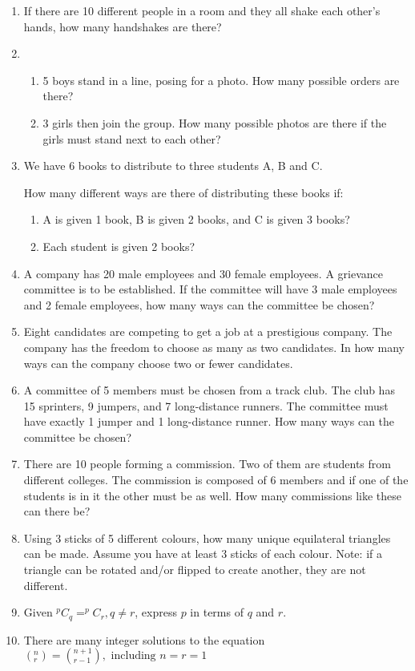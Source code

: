 \documentclass[../main.tex]{subfiles}
\begin{document}
\label{Combinations and permuations}
\begin{enumerate}[itemsep=1cm]
    \item 
    If there are 10 different people in a room and they all shake each other’s hands, how many handshakes are there?
    \item 
        \begin{enumerate}
            \item 5 boys stand in a line, posing for a photo. How many possible orders are there?
            \item 3 girls then join the group. How many possible photos are there if the girls must stand next to each other?
        \end{enumerate}
    \item 
    We have 6 books to distribute to three students A, B and C.

    How many different ways are there of distributing these books if:
        \begin{enumerate}
            \item A is given 1 book, B is given 2 books, and C is given 3 books?
            \item Each student is given 2 books?
        \end{enumerate}
    \item 
    A company has 20 male employees and 30 female employees. A grievance committee is to be established. If the committee will have 3 male employees and 2 female employees, how many ways can the committee be chosen?
    \item 
    Eight candidates are competing to get a job at a prestigious company. The company has the freedom to choose as many as two candidates. In how many ways can the company choose two or fewer candidates.
    \item 
    A committee of 5 members must be chosen from a track club. The club has 15 sprinters, 9 jumpers, and 7 long-distance runners. The committee must have exactly 1 jumper and 1 long-distance runner. How many ways can the committee be chosen?
    \item 
    There are 10 people forming a commission. Two of them are students from different colleges. The commission is composed of 6 members and if one of the students is in it the other must be as well. How many commissions like these can there be?
    \item 
    Using 3 sticks of 5 different colours, how many unique equilateral triangles can be made. Assume you have at least 3 sticks of each colour. Note: if a triangle can be rotated and/or flipped to create another, they are not different.
    \item 
    Given \(^pC_q=^pC_r, q\neq r\), express \(p\) in terms of \(q\) and \(r\).
    \item 
    There are many integer solutions to the equation \((^n_r)=(^{n+1}_{r-1}),\text{ including } n=r=1 \)
    

\end{enumerate}
\end{document}
